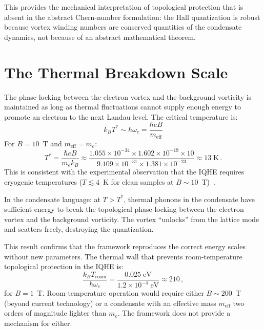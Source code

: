 \documentclass[12pt, a4paper]{article}
\newcommand{\meff}{m_{\mathrm{eff}}}
\begin{document}
This provides the mechanical interpretation of
topological protection that is absent in the
abstract Chern-number formulation: the Hall
quantization is robust because vortex winding
numbers are conserved quantities of the condensate
dynamics, not because of an abstract mathematical
theorem.


\section{The Thermal Breakdown Scale}
\label{sec:thermal}

The phase-locking between the electron vortex and
the background vorticity is maintained as long as
thermal fluctuations cannot supply enough energy to
promote an electron to the next Landau level. The
critical temperature is:
\begin{equation}
    \boxed{\;k_B T^* \sim \hbar\omega_c
    = \frac{\hbar eB}{\meff}\;}
\label{eq:T_star}
\end{equation}
For $B = 10$~T and $\meff = m_e$:
\begin{equation}
    T^* = \frac{\hbar eB}{m_e k_B}
    \approx \frac{1.055 \times 10^{-34}
    \times 1.602 \times 10^{-19} \times 10}
    {9.109 \times 10^{-31}
    \times 1.381 \times 10^{-23}}
    \approx 13\;\text{K}\,.
\label{eq:T_numerical}
\end{equation}
This is consistent with the experimental observation
that the IQHE requires cryogenic temperatures
($T \lesssim 4$~K for clean samples at $B \sim
10$~T)~\cite{klitzing_1980}.

In the condensate language: at $T > T^*$, thermal
phonons in the condensate have sufficient energy to
break the topological phase-locking between the
electron vortex and the background vorticity. The
vortex ``unlocks'' from the lattice mode and scatters
freely, destroying the quantization.

This result confirms that the framework reproduces
the correct energy scales without new parameters.
The thermal wall that prevents room-temperature
topological protection in the IQHE is:
\begin{equation}
    \frac{k_B T_{\mathrm{room}}}{\hbar\omega_c}
    = \frac{0.025\;\text{eV}}{1.2 \times
    10^{-4}\;\text{eV}} \approx 210\,,
\label{eq:thermal_ratio}
\end{equation}
for $B = 1$~T. Room-temperature operation would
require either $B \sim 200$~T (beyond current
technology) or a condensate with an effective mass
$\meff$ two orders of magnitude lighter than $m_e$.
The framework does not provide a mechanism for either.
\end{document}
